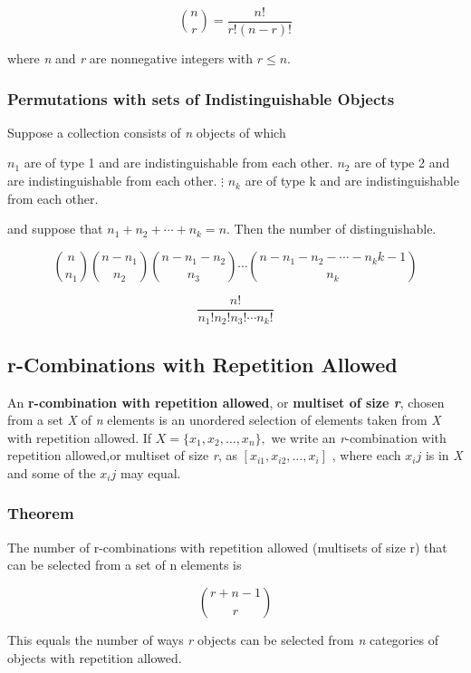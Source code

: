\documentclass{article}
\begin{document}
\[
{{n}\choose{r}}
 = \frac{n!}{r!(n - r)!}\]

where \textit{n} and \textit{r} are nonnegative integers with $r \leq n$.

\subsubsection{Permutations with sets of Indistinguishable Objects}
Suppose a collection consists of \textit{n} objects of which

\begin{center}
$n_1$ are of type 1 and are indistinguishable from each other.
$n_2$ are of type 2 and are indistinguishable from each other.
$\vdots$
$n_k$ are of type k and are indistinguishable from each other.
\end{center}

and suppose that $n_1 + n_2 + \cdots + n_k = n$. Then the number of distinguishable.

\[
{{n}\choose{n_1}}{{n - n_1}\choose{n_2}}{{n - n_1 - n_2}\choose{n_3}}\cdots{{n - n_1 - n_2 - \cdots - n_k{k - 1}}\choose{n_k}}
\]

\begin{equation}
\frac{n!}{n_1!n_2!n_3! \cdots n_k!}
\end{equation}

\subsection{r-Combinations with Repetition Allowed}
An \textbf{r-combination with repetition allowed}, or \textbf{multiset of size \textit{r}}, chosen from a set \textit{X} of \textit{n} elements is an unordered selection of elements taken from \textit{X} with repetition allowed. If $X = \{ x_1, x_2, \ldots, x_n \},$ we write an \textit{r}-combination with repetition allowed,or multiset of size \textit{r}, as \textbf{ $[ x_{i1}, x_{i2}, \ldots, x_i]$ }, where each $x_ij$ is in \textit{X} and some of the $x_ij$ may equal.

\subsubsection{Theorem}
The number of r-combinations with repetition allowed (multisets of size r) that can be selected from a set of n elements is

\[
{{r+ n - 1}\choose{r}}
\]

This equals the number of ways \textit{r} objects can be selected from \textit{n} categories of objects with repetition allowed.
\end{document}
